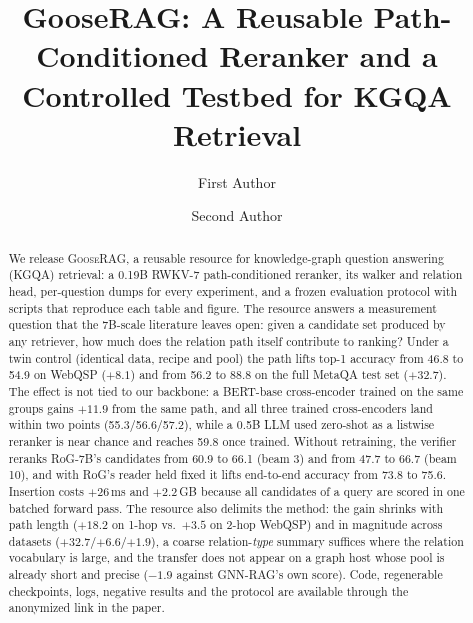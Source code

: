 \documentclass[sigconf,review]{acmart}
\begin{document}
\title{GooseRAG: A Reusable Path-Conditioned Reranker and a Controlled Testbed for KGQA Retrieval}

\author{First Author}
\author{Second Author}

\begin{abstract}
We release \textsc{GooseRAG}, a reusable resource for knowledge-graph question answering (KGQA) retrieval: a 0.19B RWKV-7 path-conditioned reranker, its walker and relation head, per-question dumps for every experiment, and a frozen evaluation protocol with scripts that reproduce each table and figure. The resource answers a measurement question that the 7B-scale literature leaves open: given a candidate set produced by any retriever, how much does the relation path itself contribute to ranking?
Under a twin control (identical data, recipe and pool) the path lifts top-1 accuracy from 46.8 to 54.9 on WebQSP ($+8.1$) and from 56.2 to 88.8 on the full MetaQA test set ($+32.7$). The effect is not tied to our backbone: a BERT-base cross-encoder trained on the same groups gains $+11.9$ from the same path, and all three trained cross-encoders land within two points (55.3/56.6/57.2), while a 0.5B LLM used zero-shot as a listwise reranker is near chance and reaches 59.8 once trained. Without retraining, the verifier reranks RoG-7B's candidates from 60.9 to 66.1 (beam 3) and from 47.7 to 66.7 (beam 10), and with RoG's reader held fixed it lifts end-to-end accuracy from 73.8 to 75.6. Insertion costs $+26$\,ms and $+2.2$\,GB because all candidates of a query are scored in one batched forward pass. The resource also delimits the method: the gain shrinks with path length ($+18.2$ on 1-hop vs.\ $+3.5$ on 2-hop WebQSP) and in magnitude across datasets ($+32.7$/$+6.6$/$+1.9$), a coarse relation-\emph{type} summary suffices where the relation vocabulary is large, and the transfer does not appear on a graph host whose pool is already short and precise ($-1.9$ against GNN-RAG's own score). Code, regenerable checkpoints, logs, negative results and the protocol are available through the anonymized link in the paper.
\end{abstract}

\end{document}
